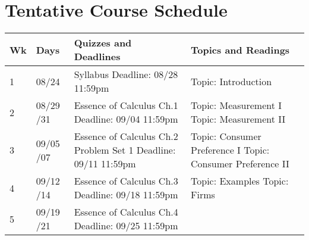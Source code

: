 \documentclass[12pt]{article}
\begin{document}
\newpage

\section*{Tentative Course Schedule}

\newlength\bb
\setlength{}
\newlength\qq
\setlength{}
\newlength\rr
\setlength{}
\newlength\pp
\setlength{}
\begin{tabular}{|p{\bb}|p{\qq}|p{\rr}|p{\pp}|}
    \hline
        Wk
        & Days
        & Quizzes and Deadlines
        & Topics and Readings
    \\
    \hline
    \hline
        1
        &
        08/24
        &
        Syllabus
        \newline
        Deadline: 08/28 11:59pm
        &
        Topic: Introduction
    \\
    \hline
        2
        &
        08/29
        \newline
        08/31
        &
        Essence of Calculus Ch.1
        \newline
        Deadline: 09/04 11:59pm
        &
        Topic: Measurement I
        \newline
        Topic: Measurement II
    \\
    \hline
        3
        &
        09/05
        \newline
        09/07
        &
        Essence of Calculus Ch.2
        \newline
        Problem Set 1
        \newline
        Deadline: 09/11 11:59pm
        &
        Topic: Consumer Preference I
        \newline
        Topic: Consumer Preference II
    \\
    \hline
        4
        &
        09/12
        \newline
        09/14
        &
        Essence of Calculus Ch.3
        \newline
        Deadline: 09/18 11:59pm
        &
        Topic: Examples
        \newline
        Topic: Firms
    \\
    \hline
        5
        &
        09/19
        \newline
        09/21
        &
        Essence of Calculus Ch.4
        \newline
        Deadline: 09/25 11:59pm

\end{tabular}
\end{document}
